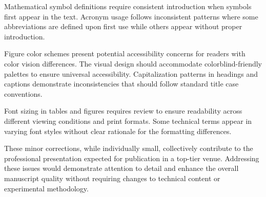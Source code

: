 Mathematical symbol definitions require consistent introduction when symbols first appear in the text. Acronym usage follows inconsistent patterns where some abbreviations are defined upon first use while others appear without proper introduction.

Figure color schemes present potential accessibility concerns for readers with color vision differences. The visual design should accommodate colorblind-friendly palettes to ensure universal accessibility. Capitalization patterns in headings and captions demonstrate inconsistencies that should follow standard title case conventions.

Font sizing in tables and figures requires review to ensure readability across different viewing conditions and print formats. Some technical terms appear in varying font styles without clear rationale for the formatting differences.

These minor corrections, while individually small, collectively contribute to the professional presentation expected for publication in a top-tier venue. Addressing these issues would demonstrate attention to detail and enhance the overall manuscript quality without requiring changes to technical content or experimental methodology.
